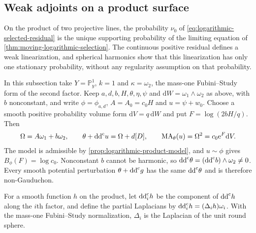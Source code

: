 \subsection{Weak adjoints on a product surface}
\label{subsec:singular-product-adjoints}

On the product of two projective lines, the probability $\nu_0$ of \eqref{eq:logarithmic-selected-residual} is the unique supporting probability of the limiting equation of \cref{thm:moving-logarithmic-selection}. The continuous positive residual defines a weak linearization, and spherical harmonics show that this linearization has only one stationary probability, without any regularity assumption on that probability.

In this subsection take $Y=\mathbb P^1_y$, $k=1$ and $\kappa=\omega_2$, the mass-one Fubini--Study form of the second factor. Keep $a,d,b,H,\theta,\eta,\psi$ and $\mathrm{d}W=\omega_1\wedge\omega_2$ as above, with $b$ nonconstant, and write $\phi=\phi_{a,d}$, $A=A_0=c_0H$ and $u=\psi+w_0$. Choose a smooth positive probability volume form $\mathrm{d}V=q\,\mathrm{d}W$ and put $F=\log(2bH/q)$. Then
\[
 \Omega=A\omega_1+b\omega_2,\qquad
 \theta+\mathrm{dd}^{\mathrm{c}} u=\Omega+d[D],\qquad
 \mathrm{MA}_\theta(u)=\Omega^2=c_0\mathrm{e}^F\mathrm{d}V.
\]
The model is admissible by \cref{prop:logarithmic-product-model}, and $u\sim\phi$ gives $B_\phi(F)=\log c_0$. Nonconstant $b$ cannot be harmonic, so $\mathrm{dd}^{\mathrm{c}}\theta=(\mathrm{dd}^{\mathrm{c}} b)\wedge\omega_2\ne0$. Every smooth potential perturbation $\theta+\mathrm{dd}^{\mathrm{c}} g$ has the same $\mathrm{dd}^{\mathrm{c}}\theta$ and is therefore non-Gauduchon.

For a smooth function $h$ on the product, let $\mathrm{dd}^{\mathrm{c}}_ih$ be the component of $\mathrm{dd}^{\mathrm{c}} h$ along the $i$th factor, and define the partial Laplacians by $\mathrm{dd}^{\mathrm{c}}_i h=(\Delta_i h)\omega_i$. With the mass-one Fubini--Study normalization, $\Delta_i$ is the Laplacian of the unit round sphere.

